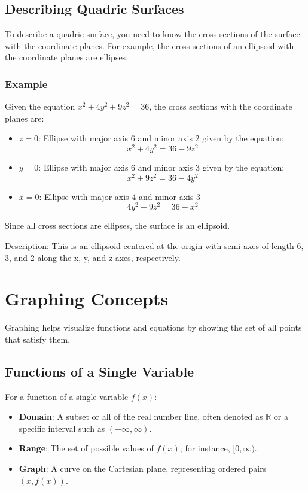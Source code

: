 \documentclass[a4paper,12pt,openany]{book}
\begin{document}
\subsection{Describing Quadric Surfaces}
To describe a quadric surface, you need to know the cross sections of the surface with the coordinate planes. For example, the cross sections of an ellipsoid with the coordinate planes are ellipses.
\subsubsection{Example}
Given the equation \(x^2 + 4y^2 + 9z^2 = 36\), the cross sections with the coordinate planes are:
\begin{itemize}
    \item{\(z = 0\): Ellipse with major axis 6 and minor axis 2 given by the equation:}
    \[
        x^2 + 4y^2 = 36-9z^2
    \]
    \item{\(y = 0\): Ellipse with major axis 6 and minor axis 3 given by the equation:}
    \[
        x^2 + 9z^2 = 36-4y^2
    \]
    \item{\(x = 0\): Ellipse with major axis 4 and minor axis 3}
    \[
        4y^2 + 9z^2 = 36-x^2
    \]
\end{itemize}
Since all cross sections are ellipses, the surface is an ellipsoid.

Description: This is an ellipsoid centered at the origin with semi-axes of length 6, 3, and 2 along the x, y, and z-axes, respectively.

\section{Graphing Concepts}

Graphing helps visualize functions and equations by showing the set of all points that satisfy them.

\subsection{Functions of a Single Variable}

For a function of a single variable \( f(x) \):
\begin{itemize}
    \item \textbf{Domain}: A subset or all of the real number line, often denoted as \(\mathbb{R}\) or a specific interval such as \((- \infty, \infty)\).
    \item \textbf{Range}: The set of possible values of \( f(x) \); for instance, \([0, \infty)\).
    \item \textbf{Graph}: A curve on the Cartesian plane, representing ordered pairs \((x, f(x))\).
\end{itemize}
\end{document}
